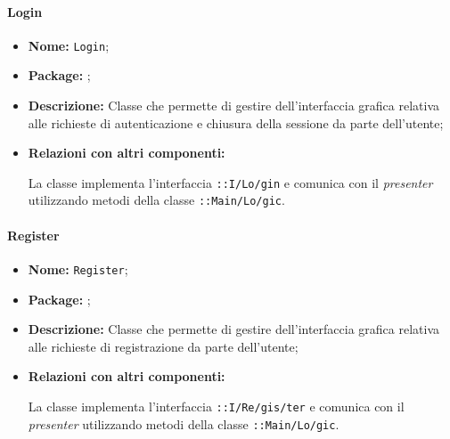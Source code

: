\paragraph{Login}
\begin{flushleft}
\begin{itemize}
\item \textbf{Nome:} \texttt{Login};
\item \textbf{Package:} \texttt{\viewAdmin{}};
\item \textbf{Descrizione:} Classe che permette di gestire dell'interfaccia grafica relativa alle richieste di autenticazione e chiusura della sessione da parte dell'utente;
\item \textbf{Relazioni con altri componenti:}
\begin{sloppypar}
La classe implementa l'interfaccia \texttt{\iViewUser{}::I\fshyp{}Lo\fshyp{}gin} e comunica con il \textit{presenter} utilizzando metodi della classe \texttt{\logicUser{}::Main\fshyp{}Lo\fshyp{}gic}.
\end{sloppypar}
\end{itemize}
\end{flushleft}

\paragraph{Register}
\begin{flushleft}
\begin{itemize}
\item \textbf{Nome:} \texttt{Register};
\item \textbf{Package:} \texttt{\viewAdmin{}};
\item \textbf{Descrizione:} Classe che permette di gestire dell'interfaccia grafica relativa alle richieste di registrazione da parte dell'utente;
\item \textbf{Relazioni con altri componenti:}
\begin{sloppypar}
La classe implementa l'interfaccia \texttt{\iViewUser{}::I\fshyp{}Re\fshyp{}gis\fshyp{}ter} e comunica con il \textit{presenter} utilizzando metodi della classe \texttt{\logicUser{}::Main\fshyp{}Lo\fshyp{}gic}.
\end{sloppypar}
\end{itemize}
\end{flushleft}

